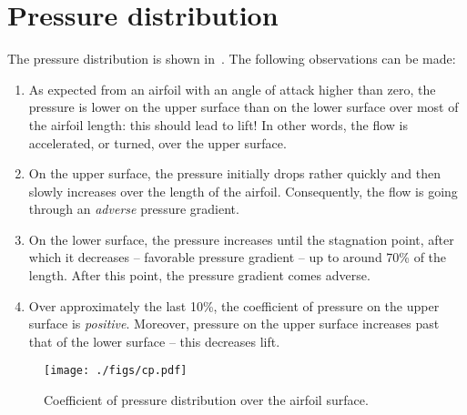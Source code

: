 \section{Pressure distribution}
The pressure distribution is shown in~.
The following observations can be made:
\begin{enumerate}
    \item As expected from an airfoil with an angle of attack higher than zero,
        the pressure is lower on the upper surface than on the lower surface over most of
        the airfoil length: this should lead to lift! In other words, the flow is
        accelerated, or turned, over the upper surface.
    \item On the upper surface, the pressure initially drops rather quickly and then
        slowly increases over the length of the airfoil. Consequently, the flow is
        going through an \textit{adverse} pressure gradient.
    \item On the lower surface, the pressure increases until the stagnation point,
        after which it decreases -- favorable pressure gradient -- up to around 70\%
        of the length. After this point, the pressure gradient comes adverse.
    \item Over approximately the last 10\%, the coefficient of pressure on the upper surface
        is \textit{positive}. Moreover, pressure on the upper surface increases past that
        of the lower surface -- this decreases lift.
\end{enumerate}

\begin{figure}
    \centering
    \texttt{[image: ./figs/cp.pdf]}
    \caption{Coefficient of pressure distribution over the airfoil surface.}\label{fig:cp}
\end{figure}


